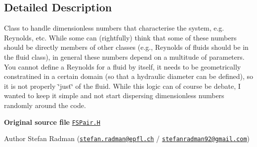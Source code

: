 \subsection{Detailed Description}
Class to handle dimensionless numbers that characterise the system, e.\+g. Reynolds, etc. While some can (rightfully) think that some of these numbers should be directly members of other classes (e.\+g., Reynolds of fluids should be in the fluid class), in general these numbers depend on a multitude of parameters. You cannot define a Reynolds for a fluid by itself, it needs to be geometrically constratined in a certain domain (so that a hydraulic diameter can be defined), so it is not properly \char`\"{}just\char`\"{} of the fluid. While this logic can of course be debate, I wanted to keep it simple and not start dispersing dimensionless numbers randomly around the code. 

{\bfseries Original source file} \href{../../../home/carlo/data/GeN-Foam/GeN-Foam_ffn/GeN-Foam/GeN-Foam/classes/thermalHydraulics/src/physicsModels/phasePairs/FSPair.H}{\tt F\+S\+Pair.\+H}

\label{_Description}%
 Author Stefan Radman (\href{mailto:stefan.radman@epfl.ch}{\tt stefan.\+radman@epfl.\+ch} / \href{mailto:stefanradman92@gmail.com}{\tt stefanradman92@gmail.\+com}) 